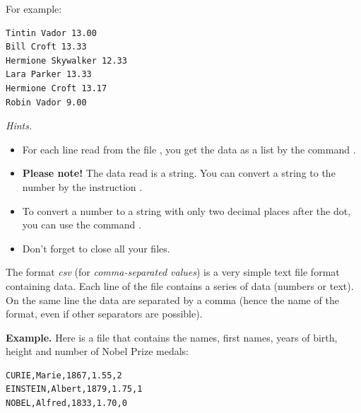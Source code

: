 \documentclass[11pt,class=report,crop=false]{standalone}
\begin{document}
\begin{activite}
\begin{enumerate}
For example:  
\begin{center}
\begin{minipage}{0.5\textwidth}
\begin{lstlisting}
Tintin Vador 13.00
Bill Croft 13.33
Hermione Skywalker 12.33
Lara Parker 13.33
Hermione Croft 13.17
Robin Vador 9.00
\end{lstlisting}
\end{minipage}
\end{center}   
  

%    

  \emph{Hints.}
  \begin{itemize}
    	\item For each line read from the file , you get the data as a list by the command .
    	
    	\item \textbf{Please note!} The data read is a string. You can convert a string  to the number  by the instruction .
    	
    	\item To convert a number to a string with only two decimal places after the dot, you can use the command .
    	
    	\item Don't forget to close all your files.
    	
   \end{itemize}
    
\end{enumerate}   
     
\end{activite}



\begin{cours}
The format \emph{csv} (for \emph{comma-separated values}) is a very simple text file format containing data.
Each line of the file contains a series of data (numbers or text). On the same line the data are separated by a comma (hence the name of the format, even if other separators are possible).

\medskip

\textbf{Example.} Here is a file that contains the names, first names, years of birth, height and number of Nobel Prize medals:
\begin{center}
\begin{minipage}{0.4\textwidth}
\begin{lstlisting}
CURIE,Marie,1867,1.55,2
EINSTEIN,Albert,1879,1.75,1
NOBEL,Alfred,1833,1.70,0
\end{lstlisting}
\end{minipage}
\end{center}

\end{cours}
\end{document}
